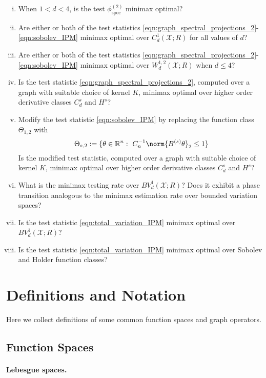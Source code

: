 \documentclass{article}
\newcommand{\Reals}{\mathbb{R}}
\newcommand{\1}{\mathbf{1}}
\newcommand{\spec}{\mathrm{spec}}
\theoremstyle{alden}
\theoremstyle{aldenthm}
\theoremstyle{definition}
\theoremstyle{remark}
\begin{document}
\begin{enumerate}[(i)]
	\item When $1 < d < 4$, is the test $\phi_{\spec}^{(2)}$ minimax optimal?
	\item Are either or both of the test statistics \eqref{eqn:graph_spectral_projections_2}-\eqref{eqn:sobolev_IPM} minimax optimal over $C_d^1(\mathcal{X};R)$ for all values of $d$?
	\item Are either or both of the test statistics \eqref{eqn:graph_spectral_projections_2}-\eqref{eqn:sobolev_IPM} minimax optimal over $W_d^{1,2}(\mathcal{X};R)$ when $d \leq 4$?
	\item Is the test statistic \eqref{eqn:graph_spectral_projections_2}, computed over a graph with suitable choice of kernel $K$, minimax optimal over higher order derivative classes $C_d^s$ and $H^s$? 
	\item Modify the test statistic \eqref{eqn:sobolev_IPM} by replacing the function class $\Theta_{1,2}$ with
	\begin{equation}
	\Theta_{s,2} := \{\theta \in \Reals^n:~ C_n^{-1} \norm{B^{(s)}\theta}_2 \leq 1\} 
	\end{equation}
	Is the modified test statistic, computed over a graph with suitable choice of kernel $K$, minimax optimal over higher order derivative classes $C_d^s$ and $H^s$?
	\item What is the minimax testing rate over $BV_d^{1}(\mathcal{X};R)$? Does it exhibit a phase transition analogous to the minimax estimation rate over bounded variation spaces?
	\item Is the test statistic \eqref{eqn:total_variation_IPM} minimax optimal over $BV_d^{1}(\mathcal{X};R)$?
	\item Is the test statistic \eqref{eqn:total_variation_IPM} minimax optimal over Sobolev and Holder function classes?
\end{enumerate}

\section{Definitions and Notation}

Here we collect definitions of some common function spaces and graph operators.

\subsection{Function Spaces}

\paragraph{Lebesgue spaces.}
\end{document}
